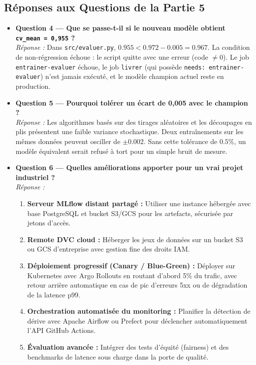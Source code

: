 \documentclass[12pt,a4paper]{article}
\begin{document}
\subsection{Réponses aux Questions de la Partie 5}
\begin{itemize}[leftmargin=*]
  \item \textbf{Question 4 — Que se passe-t-il si le nouveau modèle obtient \texttt{cv\_mean = 0,955} ?}\\
  \textit{Réponse :} Dans \texttt{src/evaluer.py}, $0.955 < 0.972 - 0.005 = 0.967$. La condition de non-régression échoue : le script quitte avec une erreur (code $\ne 0$). Le job \texttt{entrainer-evaluer} échoue, le job \texttt{livrer} (qui possède \texttt{needs: entrainer-evaluer}) n'est jamais exécuté, et le modèle champion actuel reste en production.

  \item \textbf{Question 5 — Pourquoi tolérer un écart de 0,005 avec le champion ?}\\
  \textit{Réponse :} Les algorithmes basés sur des tirages aléatoires et les découpages en plis présentent une faible variance stochastique. Deux entraînements sur les mêmes données peuvent osciller de $\pm 0.002$. Sans cette tolérance de $0.5\%$, un modèle équivalent serait refusé à tort pour un simple bruit de mesure.

  \item \textbf{Question 6 — Quelles améliorations apporter pour un vrai projet industriel ?}\\
  \textit{Réponse :}
  \begin{enumerate}
    \item \textbf{Serveur MLflow distant partagé :} Utiliser une instance hébergée avec base PostgreSQL et bucket S3/GCS pour les artefacts, sécurisée par jetons d'accès.
    \item \textbf{Remote DVC cloud :} Héberger les jeux de données sur un bucket S3 ou GCS d'entreprise avec gestion fine des droits IAM.
    \item \textbf{Déploiement progressif (Canary / Blue-Green) :} Déployer sur Kubernetes avec Argo Rollouts en routant d'abord 5\% du trafic, avec retour arrière automatique en cas de pic d'erreurs 5xx ou de dégradation de la latence p99.
    \item \textbf{Orchestration automatisée du monitoring :} Planifier la détection de dérive avec Apache Airflow ou Prefect pour déclencher automatiquement l'API GitHub Actions.
    \item \textbf{Évaluation avancée :} Intégrer des tests d'équité (fairness) et des benchmarks de latence sous charge dans la porte de qualité.
  \end{enumerate}
\end{itemize}
\end{document}
